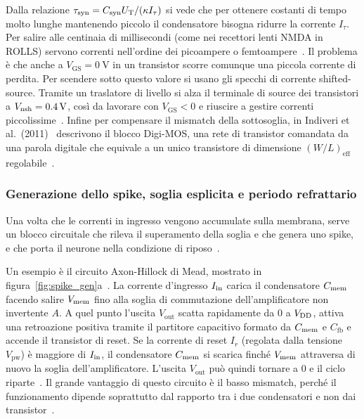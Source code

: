 Dalla relazione $\tau_{\mathrm{syn}} = C_{\mathrm{syn}} U_{\mathrm{T}} / (\kappa I_\tau)$ si vede che per ottenere costanti di tempo molto lunghe mantenendo piccolo il condensatore bisogna ridurre la corrente $I_\tau$. Per salire alle centinaia di millisecondi (come nei recettori lenti NMDA in ROLLS) servono correnti nell'ordine dei picoampere o femtoampere~\cite{indiveri2011, qiao2015}. Il problema è che anche a $V_{\mathrm{GS}} = \SI{0}{\volt}$ in un transistor scorre comunque una piccola corrente di perdita. Per scendere sotto questo valore si usano gli specchi di corrente shifted-source. Tramite un traslatore di livello si alza il terminale di source dei transistori a $V_{\mathrm{nsh}} = \SI{0{,}4}{\volt}$, così da lavorare con $V_{\mathrm{GS}} < 0$ e riuscire a gestire correnti piccolissime~\cite{indiveri2011, qiao2015}. Infine per compensare il mismatch della sottosoglia, in Indiveri et al.\ (2011)~\cite{indiveri2011} descrivono il blocco Digi-MOS, una rete di transistor comandata da una parola digitale che equivale a un unico transistore di dimensione $(W/L)_{\mathrm{eff}}$ regolabile~\cite{indiveri2011}.

\subsubsection{Generazione dello spike, soglia esplicita e periodo refrattario}
Una volta che le correnti in ingresso vengono accumulate sulla membrana, serve un blocco circuitale che rileva il superamento della soglia e che genera uno spike, e che porta il neurone nella condizione di riposo~\cite{indiveri2011}.

Un esempio è il circuito Axon-Hillock di Mead, mostrato in figura~\ref{fig:spike_gen}a~\cite{indiveri2011}. La corrente d'ingresso $I_{\mathrm{in}}$ carica il condensatore $C_{\mathrm{mem}}$ facendo salire $V_{\mathrm{mem}}$ fino alla soglia di commutazione dell'amplificatore non invertente $A$. A quel punto l'uscita $V_{\mathrm{out}}$ scatta rapidamente da $0$ a $V_{\mathrm{DD}}$, attiva una retroazione positiva tramite il partitore capacitivo formato da $C_{\mathrm{mem}}$ e $C_{\mathrm{fb}}$ e accende il transistor di reset. Se la corrente di reset $I_r$ (regolata dalla tensione $V_{\mathrm{pw}}$) è maggiore di $I_{\mathrm{in}}$, il condensatore $C_{\mathrm{mem}}$ si scarica finché $V_{\mathrm{mem}}$ attraversa di nuovo la soglia dell'amplificatore. L'uscita $V_{\mathrm{out}}$ può quindi tornare a $0$ e il ciclo riparte~\cite{indiveri2011}. Il grande vantaggio di questo circuito è il basso mismatch, perché il funzionamento dipende soprattutto dal rapporto tra i due condensatori e non dai transistor~\cite{indiveri2011}.

